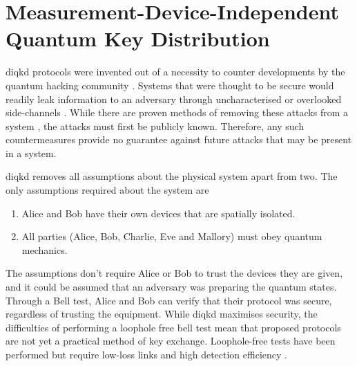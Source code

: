 

\section{Measurement-Device-Independent Quantum Key Distribution}
\label{sec:mdi-qkd}

\Ac{diqkd} protocols were invented out of a necessity to counter developments by the quantum hacking community \cite{Mayers1998}. Systems that were thought to be secure would readily leak information to an adversary through uncharacterised or overlooked side-channels \cite{Lo2014}. While there are proven methods of removing these attacks from a system \cite{Lucamarini2015Practical}, the attacks must first be publicly known. Therefore, any such countermeasures provide no guarantee against future attacks that may be present in a system. 

\Ac{diqkd} removes all assumptions about the physical system apart from two. The only assumptions required about the system are

\begin{enumerate}
	\item Alice and Bob have their own devices that are spatially isolated.
	\item All parties (Alice, Bob, Charlie, Eve and Mallory) must obey quantum mechanics.
\end{enumerate}

The assumptions don't require Alice or Bob to trust the devices they are given, and it could be assumed that an adversary was preparing the quantum states. Through a Bell test, Alice and Bob can verify that their protocol was secure, regardless of trusting the equipment. While \ac{diqkd} maximises security, the difficulties of performing a loophole free bell test mean that proposed protocols are not yet a practical method of key exchange. Loophole-free tests have been performed but require low-loss links and high detection efficiency \cite{hensen2015, shalm2015, Giustina2015}. 

